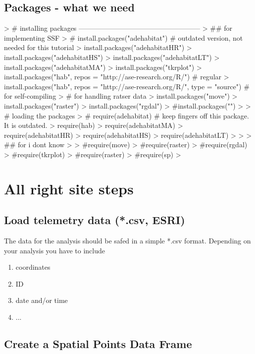 \documentclass[11pt, a4paper]{article} %
\begin{document}
\subsection{Packages - what we need}

\begin{Schunk}
\begin{Sinput}
> # installing packages -----------------------------------------------------
> ## for implementing SSF
> # install.packages("adehabitat") # outdated version, not needed for this tutorial
> install.packages("adehabitatHR")
> install.packages("adehabitatHS")
> install.packages("adehabitatLT")
> install.packages("adehabitatMA")
> install.packages("tkrplot")
> install.packages("hab", repos = "http://ase-research.org/R/") # regular
> install.packages("hab", repos = "http://ase-research.org/R/", type = "source") # for self-compiling
> # for handling ratser data
> install.packages("move")
> install.packages("raster")
> install.packages("rgdal")
> #install.packages("")
> 
> # loading the packages
> # require(adehabitat) # keep fingers off this package. It is outdated.
> require(hab)
> require(adehabitatMA)
> require(adehabitatHR)
> require(adehabitatHS)
> require(adehabitatLT)
> 
> 
> ## for i dont know
> 
> #require(move)
> #require(raster)
> #require(rgdal)
> #require(tkrplot)
> #require(raster)
> #require(sp)
> 
\end{Sinput}
\end{Schunk}

\section{All right site steps}

\subsection{Load telemetry data (*.csv, ESRI)}%
The data for the analysis should be safed in a simple *.csv format. Depending on your analysis you have to include 
\begin{enumerate}
\item{coordinates}
\item{ID}
\item{date and/or time}
\item{...}
\end{enumerate}



\subsection{Create a Spatial Points Data Frame}%
\end{document}
